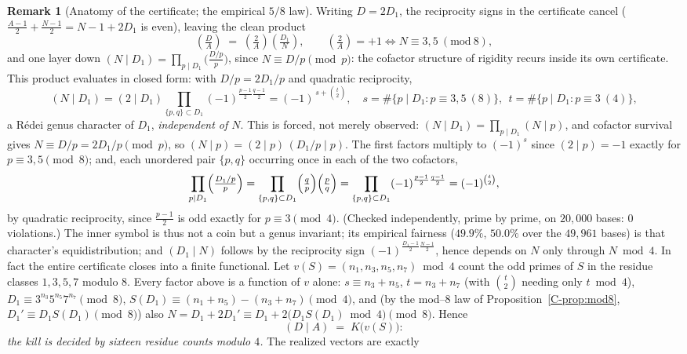 \documentclass[11pt]{article}
\theoremstyle{definition}
\newtheorem{remark}[theorem]{Remark}
\begin{document}
\begin{remark}[Anatomy of the certificate; the empirical $5/8$ law]\label{rem:fiveeighths}
Writing $D=2D_1$, the reciprocity signs in the certificate cancel
\textup{(}$\tfrac{A-1}2+\tfrac{N-1}2=N-1+2D_1$ is even\textup{)}, leaving the clean product
\[ \left(\tfrac{D}{A}\right)\;=\;\left(\tfrac{2}{A}\right)\left(\tfrac{D_1}{N}\right),\qquad
\left(\tfrac{2}{A}\right)=+1\iff N\equiv3,5\ (\mathrm{mod}\ 8), \]
and one layer down $(N\mid D_1)=\prod_{p\mid D_1}\bigl(\tfrac{D/p}{p}\bigr)$, since
$N\equiv D/p\pmod p$: the cofactor structure of rigidity recurs inside its own certificate. This product evaluates in closed form: with $D/p=2D_1/p$ and quadratic
reciprocity,
\[ (N\mid D_1)=(2\mid D_1)\!\!\prod_{\{p,q\}\subset D_1}\!\!(-1)^{\frac{p-1}2\frac{q-1}2}
=(-1)^{\,s+\binom{t}{2}},\quad s=\#\{p\mid D_1:p\equiv3,5\ (8)\},\ \ t=\#\{p\mid D_1:p\equiv3\ (4)\}, \]
a R\'edei genus character of $D_1$, \emph{independent of $N$}. This is forced, not merely observed:
$(N\mid D_1)=\prod_{p\mid D_1}(N\mid p)$, and cofactor survival gives $N\equiv D/p=2D_1/p\pmod p$, so
$(N\mid p)=(2\mid p)\,(D_1/p\mid p)$. The first factors multiply to $(-1)^{s}$ since $(2\mid p)=-1$
exactly for $p\equiv3,5\pmod 8$; and, each unordered pair $\{p,q\}$ occurring once in each of the two
cofactors,
\[ \prod_{p\mid D_1}\Bigl(\tfrac{D_1/p}{p}\Bigr)=\prod_{\{p,q\}\subset D_1}\Bigl(\tfrac qp\Bigr)
\Bigl(\tfrac pq\Bigr)=\prod_{\{p,q\}\subset D_1}(-1)^{\frac{p-1}2\frac{q-1}2}=(-1)^{\binom t2}, \]
by quadratic reciprocity, since $\tfrac{p-1}2$ is odd exactly for $p\equiv3\pmod4$. (Checked
independently, prime by prime, on $20{,}000$ bases: $0$ violations.) The inner symbol is thus not a coin but a genus invariant; its empirical fairness
($49.9\%$, $50.0\%$ over the $49{,}961$ bases) is that character's equidistribution; and
$(D_1\mid N)$ follows by the reciprocity sign $(-1)^{\frac{D_1-1}2\frac{N-1}2}$, hence depends on $N$
only through $N\bmod4$. In fact the entire certificate closes into a finite functional. Let
$v(S)=(n_1,n_3,n_5,n_7)\bmod4$ count the odd primes of $S$ in the residue classes $1,3,5,7$ modulo
$8$. Every factor above is a function of $v$ alone: $s\equiv n_3+n_5$, $t=n_3+n_7$ (with
$\binom t2$ needing only $t\bmod4$), $D_1\equiv3^{n_3}5^{n_5}7^{n_7}\pmod8$,
$S(D_1)\equiv(n_1+n_5)-(n_3+n_7)\pmod4$, and (by the mod--$8$ law of
Proposition~\ref{C-prop:mod8}, $D_1'\equiv D_1S(D_1)\pmod8$) also
$N=D_1+2D_1'\equiv D_1+2\bigl(D_1S(D_1)\bmod4\bigr)\pmod8$. Hence
\[ (D\mid A)\;=\;K\bigl(v(S)\bigr): \]
\emph{the kill is decided by sixteen residue counts modulo $4$.} The realized vectors are exactly

\end{remark}
\end{document}
